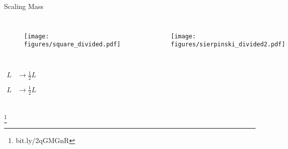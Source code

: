 \documentclass[10pt]{beamer}
\newcommand\blfootnote[1]{%
  \begingroup
  \renewcommand\thefootnote{}\footnote{#1}%
  \addtocounter{footnote}{-1}%
  \endgroup
}
\begin{document}
\begin{frame}{Scaling Mass}
    \begin{columns}[c]
        \column{1.5in}
        \begin{figure}[h!]
            \centering
            \texttt{[image: figures/square\_divided.pdf]}
        \end{figure}
    \column{1.5in}
        \begin{figure}[h!]
            \centering
            \texttt{[image: figures/sierpinski\_divided2.pdf]}
        \end{figure}
    \end{columns}
    \begin{columns}[c]
        \column{1.5in}
            \begin{align*}
                L &\rightarrow \frac{1}{2} L \\
            \end{align*}
        \column{1.5in}
            \begin{align*}
                L &\rightarrow \frac{1}{2} L \\
            \end{align*}
    \end{columns}
    \blfootnote{bit.ly/2qGMGnR}
\end{frame}
\end{document}
